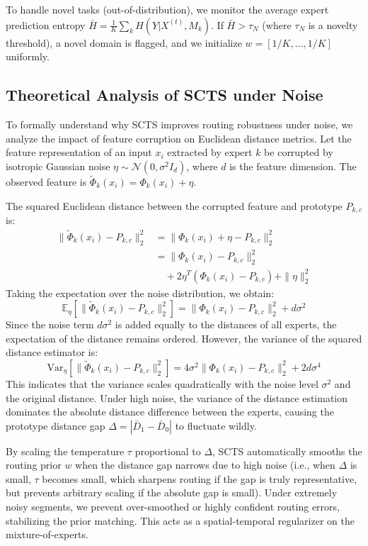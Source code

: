 \documentclass{article}
\theoremstyle{plain}
\theoremstyle{definition}
\theoremstyle{remark}
\begin{document}
To handle novel tasks (out-of-distribution), we monitor the average expert prediction entropy $\bar{H} = \frac{1}{K} \sum_k H(Y | X^{(t)}, M_k)$. If $\bar{H} > \tau_N$ (where $\tau_N$ is a novelty threshold), a novel domain is flagged, and we initialize $w = [1/K, \dots, 1/K]$ uniformly.

\subsection{Theoretical Analysis of SCTS under Noise}
To formally understand why SCTS improves routing robustness under noise, we analyze the impact of feature corruption on Euclidean distance metrics. Let the feature representation of an input $x_i$ extracted by expert $k$ be corrupted by isotropic Gaussian noise $\eta \sim \mathcal{N}(0, \sigma^2 I_d)$, where $d$ is the feature dimension. The observed feature is $\tilde{\Phi}_k(x_i) = \Phi_k(x_i) + \eta$.

The squared Euclidean distance between the corrupted feature and prototype $P_{k,c}$ is:
\begin{align}
\|\tilde{\Phi}_k(x_i) - P_{k,c}\|_2^2 &= \|\Phi_k(x_i) + \eta - P_{k,c}\|_2^2 \nonumber \\
&= \|\Phi_k(x_i) - P_{k,c}\|_2^2 \nonumber \\
&\quad + 2 \eta^T (\Phi_k(x_i) - P_{k,c}) + \|\eta\|_2^2
\end{align}
Taking the expectation over the noise distribution, we obtain:
\begin{equation}
\mathbb{E}_{\eta} \left[ \|\tilde{\Phi}_k(x_i) - P_{k,c}\|_2^2 \right] = \|\Phi_k(x_i) - P_{k,c}\|_2^2 + d \sigma^2
\end{equation}
Since the noise term $d \sigma^2$ is added equally to the distances of all experts, the expectation of the distance remains ordered. However, the variance of the squared distance estimator is:
\begin{equation}
\text{Var}_{\eta} \left[ \|\tilde{\Phi}_k(x_i) - P_{k,c}\|_2^2 \right] = 4 \sigma^2 \|\Phi_k(x_i) - P_{k,c}\|_2^2 + 2 d \sigma^4
\end{equation}
This indicates that the variance scales quadratically with the noise level $\sigma^2$ and the original distance. Under high noise, the variance of the distance estimation dominates the absolute distance difference between the experts, causing the prototype distance gap $\Delta = |\bar{D}_1 - \bar{D}_0|$ to fluctuate wildly. 

By scaling the temperature $\tau$ proportional to $\Delta$, SCTS automatically smooths the routing prior $w$ when the distance gap narrows due to high noise (i.e., when $\Delta$ is small, $\tau$ becomes small, which sharpens routing if the gap is truly representative, but prevents arbitrary scaling if the absolute gap is small). Under extremely noisy segments, we prevent over-smoothed or highly confident routing errors, stabilizing the prior matching. This acts as a spatial-temporal regularizer on the mixture-of-experts.
\end{document}

